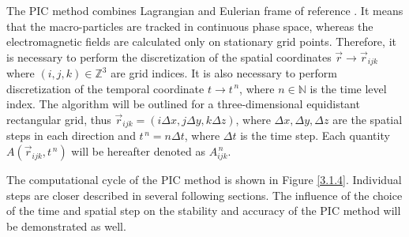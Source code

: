 The PIC method combines Lagrangian and Eulerian frame of reference \cite{Dawson1983}. It means that the macro-particles are tracked in continuous phase space, whereas the electromagnetic fields are calculated only on stationary grid points. Therefore, it is necessary to perform the discretization of the spatial coordinates $ \vec{r} \rightarrow \vec{r}_{i j k} $ where $ (i,j,k) \in \mathbb{Z}^{3} $ are grid indices. It is also necessary to perform discretization of the temporal coordinate $ t \rightarrow t^{\,n} $, where $ n \in \mathbb{N} $ is the time level index. The algorithm will be outlined for a three-dimensional equidistant rectangular grid, thus $ \vec{r}_{i j k} = \left(i \Delta x, j \Delta y, k \Delta z\right) $, where $ \Delta x, \Delta y, \Delta z $ are the spatial steps in each direction and $ t^{\,n} = n\Delta t $, where $ \Delta t $ is the time step. Each quantity $ A \left(\vec{r}_{i j k}, t^{\,n} \right) $ will be hereafter denoted as $ A_{ijk}^{\,n} $.

The computational cycle of the PIC method is shown in Figure \ref{3.1.4}. Individual steps are closer described in several following sections. The influence of the choice of the time and spatial step on the stability and accuracy of the PIC method will be demonstrated as well.